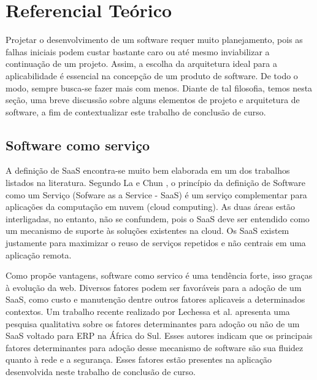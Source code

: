 \chapter{Referencial Teórico}


Projetar o desenvolvimento de um software requer muito planejamento, pois as falhas iniciais podem custar bastante caro ou até mesmo inviabilizar a continuação de um projeto. Assim, a escolha da arquitetura ideal para a aplicabilidade é essencial na concepção de um produto de software. 
De todo o modo, sempre busca-se fazer mais com menos. Diante de tal filosofia, temos nesta seção, uma breve discussão sobre alguns elementos de projeto e arquitetura de software, a fim de contextualizar este trabalho de conclusão de curso.


 \section{Software como serviço}\label{sec:saas}


A definição de SaaS encontra-se muito bem elaborada em um dos trabalhos listados na literatura. Segundo La e Chun \citep{La2009Systematic}, o princípio da definição de Software como um Serviço (Sofware as a Service - SaaS) é um serviço complementar para aplicações da computação em nuvem (cloud computing). As duas áreas estão interligadas, no entanto, não se confundem, pois o SaaS deve ser entendido como um mecanismo de suporte às soluções existentes na cloud. Os SaaS existem justamente para maximizar o reuso de serviços repetidos e não centrais em uma aplicação remota.


Como propõe vantagens, software como servico é uma tendência forte, isso graças à evolução da web. Diversos fatores podem ser favoráveis para a adoção de um SaaS, como custo e manutenção dentre outros fatores aplicaveis a determinados contextos. Um trabalho recente realizado por Lechessa et al. \cite{LechesaSS11} apresenta uma pesquisa qualitativa sobre os fatores determinantes para adoção ou não de um SaaS voltado para ERP na África do Sul. Esses autores indicam que os principais fatores determinantes para adoção desse mecanismo de software são sua fluidez quanto à rede e a segurança. Esses fatores estão presentes na aplicação desenvolvida neste trabalho de conclusão de curso.
 

